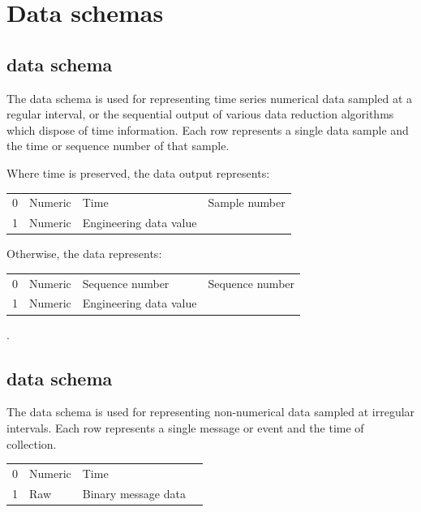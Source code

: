\documentclass{article}
\begin{document}
\section{Data schemas}

\subsection{ data schema}

The  data schema is used for representing time
series numerical data sampled at a regular interval, or the sequential
output of various data reduction algorithms which dispose of time
information.  Each row represents a single data sample and the time or
sequence number of that sample.

Where time is preserved, the data output represents:

\begin{center}
  \begin{tabular}{llll}
    \schemaheader{} \\ \hline
    0 & Numeric & Time & Sample number \\
    1 & Numeric & Engineering data value & \undef{}
  \end{tabular}
\end{center}

Otherwise, the data represents:

\begin{center}
  \begin{tabular}{llll}
    \schemaheader{} \\ \hline
    0 & Numeric & Sequence number & Sequence number \\
    1 & Numeric & Engineering data value & \undef{}
  \end{tabular}
\end{center}

.

\subsection{ data schema}

The  data schema is used for representing
non-numerical data sampled at irregular intervals.  Each row
represents a single message or event and the time of collection.

\begin{center}
  \begin{tabular}{llll}
    \schemaheader{} \\ \hline
    0 & Numeric & Time & \undef{} \\
    1 & Raw & Binary message data & \undef{}
  \end{tabular}
\end{center}
\end{document}

